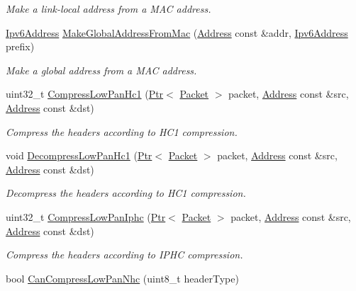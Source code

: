 \begin{DoxyCompactItemize}
\begin{DoxyCompactList}\small\item\em Make a link-\/local address from a M\+AC address. \end{DoxyCompactList}\item 
\hyperlink{classns3_1_1Ipv6Address}{Ipv6\+Address} \hyperlink{classns3_1_1SixLowPanNetDevice_af8af918eb21378d30eb0e1b45e978fff}{Make\+Global\+Address\+From\+Mac} (\hyperlink{classns3_1_1Address}{Address} const \&addr, \hyperlink{classns3_1_1Ipv6Address}{Ipv6\+Address} prefix)
\begin{DoxyCompactList}\small\item\em Make a global address from a M\+AC address. \end{DoxyCompactList}\item 
uint32\+\_\+t \hyperlink{classns3_1_1SixLowPanNetDevice_a0e1957fbfb793cd011b4b3f89c550b8f}{Compress\+Low\+Pan\+Hc1} (\hyperlink{classns3_1_1Ptr}{Ptr}$<$ \hyperlink{classns3_1_1Packet}{Packet} $>$ packet, \hyperlink{classns3_1_1Address}{Address} const \&src, \hyperlink{classns3_1_1Address}{Address} const \&dst)
\begin{DoxyCompactList}\small\item\em Compress the headers according to H\+C1 compression. \end{DoxyCompactList}\item 
void \hyperlink{classns3_1_1SixLowPanNetDevice_a649ef9717609424699311ea61c8e3fc8}{Decompress\+Low\+Pan\+Hc1} (\hyperlink{classns3_1_1Ptr}{Ptr}$<$ \hyperlink{classns3_1_1Packet}{Packet} $>$ packet, \hyperlink{classns3_1_1Address}{Address} const \&src, \hyperlink{classns3_1_1Address}{Address} const \&dst)
\begin{DoxyCompactList}\small\item\em Decompress the headers according to H\+C1 compression. \end{DoxyCompactList}\item 
uint32\+\_\+t \hyperlink{classns3_1_1SixLowPanNetDevice_a67bf1501ba018d90c5bdb442371a3722}{Compress\+Low\+Pan\+Iphc} (\hyperlink{classns3_1_1Ptr}{Ptr}$<$ \hyperlink{classns3_1_1Packet}{Packet} $>$ packet, \hyperlink{classns3_1_1Address}{Address} const \&src, \hyperlink{classns3_1_1Address}{Address} const \&dst)
\begin{DoxyCompactList}\small\item\em Compress the headers according to I\+P\+HC compression. \end{DoxyCompactList}\item 
bool \hyperlink{classns3_1_1SixLowPanNetDevice_a44cfa681aaac7a83c160e9cdfc90d7e0}{Can\+Compress\+Low\+Pan\+Nhc} (uint8\+\_\+t header\+Type)

\end{DoxyCompactItemize}
